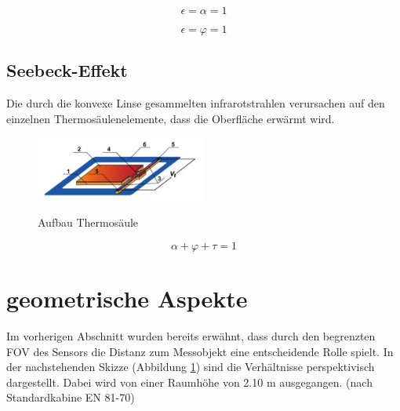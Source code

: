 \begin{equation}
\label{eq4}
\epsilon = \alpha  = 1
\end{equation}

\begin{equation}
\label{eq4}
\epsilon = \varphi  = 1
\end{equation}



\subsection{Seebeck-Effekt}
\label{seebeck}

Die durch die konvexe Linse gesammelten infrarotstrahlen verursachen auf den einzelnen Thermosäulenelemente, dass die Oberfläche erwärmt wird. 


\begin{figure}[H]
	\centering
	\includegraphics[width=0.5\textwidth]
	{fig/Mems_Thermopile.PNG}
	\caption[Aufbau Thermosäule]{Aufbau Thermosäule} \protect\cite{AMG8834}
	\label{fig:AufbauThermo}
\end{figure}

\begin{equation}
\label{eq4}
\alpha + \varphi + \tau  = 1
\end{equation}



\section{geometrische Aspekte}

Im vorherigen Abschnitt wurden bereits erwähnt, dass durch den begrenzten \ac{FOV} des Sensors die Distanz zum Messobjekt eine entscheidende Rolle spielt. In der nachstehenden Skizze (Abbildung \ref{}) sind die Verhältnisse perspektivisch dargestellt. Dabei wird von einer Raumhöhe von 2.10 m ausgegangen. (nach Standardkabine EN 81-70)   


